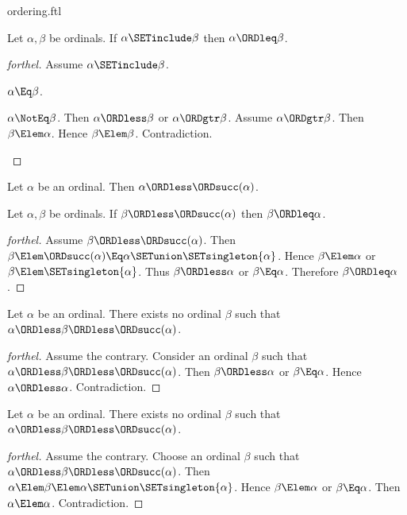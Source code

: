 \documentclass{stex}
\begin{document}
\begin{smodule}{ordering.ftl}
\begin{proposition}[forthel]
  Let $\alpha, \beta$ be ordinals.
  If $\alpha \SETinclude \beta$ then $\alpha \ORDleq \beta$.
\end{proposition}
\begin{proof}[forthel]
  Assume $\alpha \SETinclude \beta$.

  \begin{case}{$\alpha \Eq \beta$.} \end{case}

  \begin{case}{$\alpha \NotEq \beta$.}
    Then $\alpha \ORDless \beta$ or $\alpha \ORDgtr \beta$.
    Assume $\alpha \ORDgtr \beta$.
    Then $\beta \Elem \alpha$.
    Hence $\beta \Elem \beta$.
    Contradiction.
  \end{case}
\end{proof}

\begin{proposition}[forthel]
  Let $\alpha$ be an ordinal.
  Then $\alpha \ORDless \ORDsucc(\alpha)$.
\end{proposition}

\begin{proposition}[forthel]
  Let $\alpha, \beta$ be ordinals.
  If $\beta \ORDless \ORDsucc(\alpha)$ then $\beta \ORDleq \alpha$.
\end{proposition}
\begin{proof}[forthel]
  Assume $\beta \ORDless \ORDsucc(\alpha)$.
  Then $\beta \Elem \ORDsucc(\alpha) \Eq \alpha \SETunion \SETsingleton{\alpha}$.
  Hence $\beta \Elem \alpha$ or $\beta \Elem \SETsingleton{\alpha}$.
  Thus $\beta \ORDless \alpha$ or $\beta \Eq \alpha$.
  Therefore $\beta \ORDleq \alpha$.
\end{proof}

\begin{proposition}[forthel]
  Let $\alpha$ be an ordinal.
  There exists no ordinal $\beta$ such that $\alpha \ORDless \beta \ORDless \ORDsucc(\alpha)$.
\end{proposition}
\begin{proof}[forthel]
  Assume the contrary.
  Consider an ordinal $\beta$ such that $\alpha \ORDless \beta \ORDless \ORDsucc(\alpha)$.
  Then $\beta \ORDless \alpha$ or $\beta \Eq \alpha$.
  Hence $\alpha \ORDless \alpha$.
  Contradiction.
\end{proof}

\begin{proposition}[forthel]
  Let $\alpha$ be an ordinal.
  There exists no ordinal $\beta$ such that $\alpha \ORDless \beta \ORDless \ORDsucc(\alpha)$.
\end{proposition}
\begin{proof}[forthel]
  Assume the contrary.
  Choose an ordinal $\beta$ such that $\alpha \ORDless \beta \ORDless \ORDsucc(\alpha)$.
  Then $\alpha \Elem \beta \Elem \alpha \SETunion \SETsingleton{\alpha}$.
  Hence $\beta \Elem \alpha$ or $\beta \Eq \alpha$.
  Then $\alpha \Elem \alpha$.
  Contradiction.
\end{proof}


\end{smodule}
\end{document}
